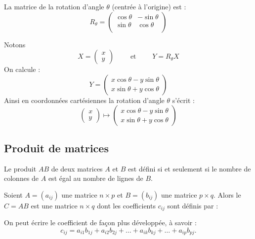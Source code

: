 \documentclass[11pt,class=report,crop=false]{standalone}
\begin{document}
\begin{exemple}
La matrice de la rotation d'angle $\theta$ (centrée à l'origine) est :
$$R_\theta = 
\begin{pmatrix}
	\cos \theta & -\sin \theta \\ 
	\sin\theta & \cos \theta\\ 
\end{pmatrix}$$


Notons 
$$X = \begin{pmatrix}x \\ y \end{pmatrix}
\qquad \text{ et } \qquad
Y = R_\theta X$$
On calcule :
$$Y = \begin{pmatrix}x \cos \theta - y \sin \theta \\ x\sin \theta + y \cos \theta \end{pmatrix}$$
Ainsi en coordonnées cartésiennes la rotation d'angle $\theta$ s'écrit :
	$$\begin{pmatrix}x \\ y \end{pmatrix} \longmapsto \begin{pmatrix} x \cos \theta - y \sin \theta \\ x\sin \theta + y \cos \theta\end{pmatrix}$$
\end{exemple}


\subsection{Produit de matrices}


Le produit $AB$ de deux matrices $A$ et $B$ est défini si et seulement si le nombre de colonnes de
$A$ est égal au nombre de lignes de $B$.

\begin{definition}
	Soient $A=(a_{ij})$ une matrice $n\times p$ et $B=(b_{ij})$ une matrice $p\times q$.
	Alors le  $C=AB$ est une matrice $n\times q$ dont les coefficients $c_{ij}$
	sont définis par :
	
\end{definition}

On peut écrire le coefficient de façon plus développée, à savoir :
$$c_{ij}=a_{i1}b_{1j}+a_{i2}b_{2j}+ \dots +
a_{ik}b_{kj}+ \dots + a_{ip}b_{pj}.$$
\end{document}
